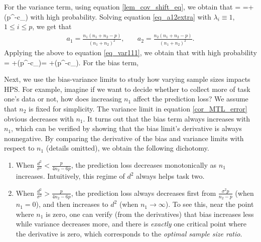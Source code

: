 {\cor
For the variance term, using equation \eqref{lem_cov_shift_eq}, we obtain that
\be\label{eq_var111} = \tr{}=+\OO(p^{-c_\varphi})\ee
with high probability. Solving equation \eqref{eq_a12extra} with $\lambda_i\equiv 1$, $1\le i\le p$, we get that
	\begin{align}
		 a_1 = \frac{n_1(n_1 + n_2 - p)}{(n_1 + n_2)^2} ,\quad
		& a_2 = \frac{n_2(n_1 + n_2 - p)}{(n_1 +n_2)^2} . \label{simplesovlea12}
			\end{align}
Applying the above to equation \eqref{eq_var111}, we obtain that with high probability
\be\label{eq_var112}  =  \cdot {}+\OO(p^{-c_\varphi})=  +\OO(p^{-c_\varphi}).\ee
For the bias term,
}


Next, we use the bias-variance limits to study how varying sample sizes impacts HPS.
For example, imagine if we want to decide whether to collect more of task one's data or not, how does increasing $n_1$ affect the prediction loss?
We assume that $n_2$ is fixed for simplicity.
The variance limit in equation \eqref{cor_MTL_error} obvious decreases with $n_1$.
It turns out that the bias term always increases with $n_1$, which can be verified by showing that the bias limit's derivative is always nonnegative.
By comparing the derivative of the bias and variance limits with respect to $n_1$ (details omitted), we obtain the following dichotomy.
\begin{enumerate}
	\item When $\frac{d^2}{\sigma^2} < \frac{p}{4n_2 - 6p}$, the prediction loss decreases monotonically as $n_1$ increases.
	Intuitively, this regime of $d^2$ always helps task two.
	\item When $\frac{d^2}{\sigma^2} > \frac{p}{4n_2 - 6p}$, the prediction loss always decreases first from $\frac{\sigma^2 p}{n_2 - p}$ (when $n_1 = 0$), and then increases to $d^2$ (when $n_1 \rightarrow \infty$).
	To see this, near the point where $n_1$ is zero, one can verify (from the derivatives) that bias increases less while variance decreases more, and there is \textit{exactly} one critical point where the derivative is zero, which corresponds to the \textit{optimal sample size ratio}.
\end{enumerate}
\fi


